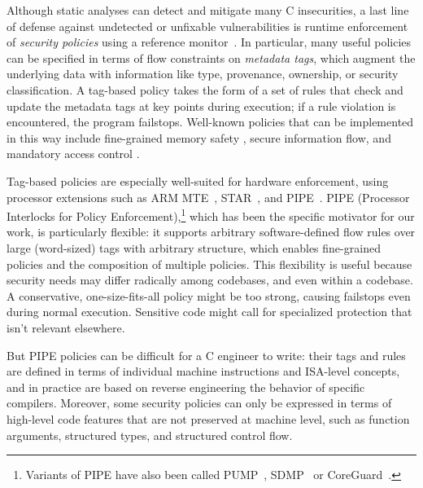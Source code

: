 \documentclass{llncs}
\begin{document}
Although static
analyses can detect and mitigate many C insecurities, a last line of
defense against undetected or unfixable vulnerabilities is runtime
enforcement of {\em security policies} using a reference
monitor~\cite{Anderson72:PlanningStudy}. In particular, 
many useful policies can be specified in terms of flow constraints on 
\emph{metadata tags}, which augment the underlying data with information like type, provenance,
ownership, or security classification. A tag-based policy takes the form of a set of
rules that check and update the metadata tags at key points during execution; if a rule violation is
encountered, the program failstops. Well-known policies that can be implemented
in this way include fine-grained memory safety \cite{Witchel02:MondrianMem}, secure information flow,
\cite{Denning76:SFIlattice} and mandatory access control \cite{USDoD85:OrangeBook}. 

Tag-based policies are especially well-suited for hardware enforcement, using 
processor extensions such as ARM MTE~\cite{arm-mte},
STAR~\cite{Gollapudi+23}, and
PIPE~\cite{Dhawan+15,Azevedo+16,Azevedo+15}.  PIPE (Processor
Interlocks for Policy Enforcement),\footnote{ Variants of PIPE have
also been called PUMP~\cite{Dhawan+14,Dhawan+15},
SDMP~\cite{Dover16,RoesslerD18} or CoreGuard~\cite{Dover20}.}
which has been the specific motivator for our work, is particularly flexible: it supports
arbitrary software-defined flow rules over large (word-sized) tags with arbitrary structure,
which enables fine-grained policies and the composition of multiple policies.
This flexibility is useful because security needs may differ radically among codebases,
and even within a codebase. A conservative, one-size-fits-all policy might be too strong,
causing failstops even during normal execution. Sensitive code might call for specialized
protection that isn't relevant elsewhere.

But PIPE policies can be difficult for a C engineer to write: their tags and rules
are defined in terms of individual machine instructions and ISA-level
concepts, and in practice are based on reverse engineering the behavior
of specific compilers. 
Moreover, some security policies can only be expressed in terms of high-level code
features that are not preserved at machine level, such as function
arguments, structured types, and structured control flow.
\end{document}
